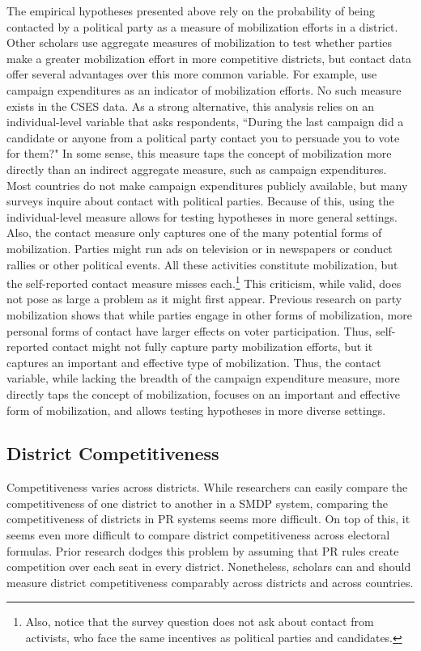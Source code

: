 \documentclass[12pt]{article}
\begin{document}
The empirical hypotheses presented above rely on the probability of being contacted by a political party as a measure of mobilization efforts in a district. Other scholars use aggregate measures of mobilization to test whether parties make a greater mobilization effort in more competitive districts, but contact data offer several advantages over this more common variable. For example, \cite{CoxMunger1989} use campaign expenditures as an indicator of mobilization efforts. No such measure exists in the CSES data. As a strong alternative, this analysis relies on an individual-level variable that asks respondents, ``During the last campaign did a candidate or anyone from a political party contact you to persuade you to vote for them?" In some sense, this measure taps the concept of mobilization more directly than an indirect aggregate measure, such as campaign expenditures. Most countries do not make campaign expenditures publicly available, but many surveys inquire about contact with political parties. Because of this, using the individual-level measure allows for testing hypotheses in more general settings. Also, the contact measure only captures one of the many potential forms of mobilization. Parties might run ads on television or in newspapers or conduct rallies or other political events. All these activities constitute mobilization, but the self-reported contact measure misses each.\footnote{Also, notice that the survey question does not ask about contact from activists, who face the same incentives as political parties and candidates.} This criticism, while valid, does not pose as large a problem as it might first appear. Previous research on party mobilization \citep{GerberGreen2000, HuckfeldtSprague1992} shows that while parties engage in other forms of mobilization, more personal forms of contact have larger effects on voter participation. Thus, self-reported contact might not fully capture party mobilization efforts, but it captures an important and effective type of mobilization. Thus, the contact variable, while lacking the breadth of the campaign expenditure measure, more directly taps the concept of mobilization, focuses on an important and effective form of mobilization, and allows testing hypotheses in more diverse settings.

\subsection*{District Competitiveness}

Competitiveness varies across districts. While researchers can easily compare the competitiveness of one district to another in a SMDP system, comparing the competitiveness of districts in PR systems seems more difficult. On top of this, it seems even more difficult to compare district competitiveness across electoral formulas. Prior research dodges this problem by assuming that PR rules create competition over each seat in every district. Nonetheless, scholars can and should measure district competitiveness comparably across districts and across countries.
\end{document}
